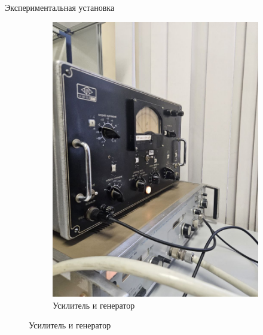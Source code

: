\documentclass[12pt]{beamer}
\begin{document}
\begin{frame}{Экспериментальная установка}
\begin{figure}[!h]
\begin{subfigure}{0.45\textwidth}
            \includegraphics[scale=0.08]{photo_2024-12-24_17-45-34.jpg}
            \caption{Усилитель и генератор}
        \end{subfigure}
    \end{figure}
    
\end{frame}
\end{document}
